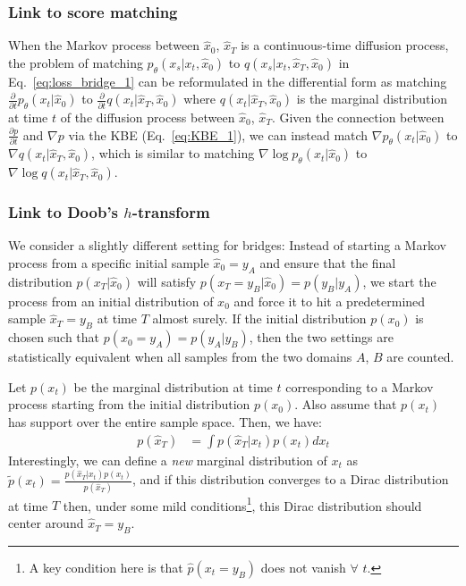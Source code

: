 \subsubsection{Link to score matching}

When the Markov process between $\hat{x}_{0}$, $\hat{x}_{T}$ is
a continuous-time diffusion process, the problem of matching $p_{\theta}\left(x_{s}|x_{t},\hat{x}_{0}\right)$
to $q\left(x_{s}|x_{t},\hat{x}_{T},\hat{x}_{0}\right)$ in Eq.~\ref{eq:loss_bridge_1}
can be reformulated in the differential form as matching $\frac{\partial}{\partial t}p_{\theta}\left(x_{t}|\hat{x}_{0}\right)$
to $\frac{\partial}{\partial t}q\left(x_{t}|\hat{x}_{T},\hat{x}_{0}\right)$
where $q\left(x_{t}|\hat{x}_{T},\hat{x}_{0}\right)$ is the marginal
distribution at time $t$ of the diffusion process between $\hat{x}_{0}$,
$\hat{x}_{T}$. Given the connection between $\frac{\partial p}{\partial t}$
and $\nabla p$ via the KBE (Eq.~\ref{eq:KBE_1}), we can instead
match $\nabla p_{\theta}\left(x_{t}|\hat{x}_{0}\right)$ to $\nabla q\left(x_{t}|\hat{x}_{T},\hat{x}_{0}\right)$,
which is similar to matching $\nabla\log p_{\theta}\left(x_{t}|\hat{x}_{0}\right)$
to $\nabla\log q\left(x_{t}|\hat{x}_{T},\hat{x}_{0}\right)$.

\subsubsection{Link to Doob's $h$-transform}

We consider a slightly different setting for bridges: Instead of starting
a Markov process from a specific initial sample $\hat{x}_{0}=y_{A}$
and ensure that the final distribution $p\left(x_{T}|\hat{x}_{0}\right)$
will satisfy $p\left(x_{T}=y_{B}|\hat{x}_{0}\right)=p\left(y_{B}|y_{A}\right)$,
we start the process from an initial distribution of $x_{0}$ and
force it to hit a predetermined sample $\hat{x}_{T}=y_{B}$ at time
$T$ almost surely. If the initial distribution $p\left(x_{0}\right)$
is chosen such that $p\left(x_{0}=y_{A}\right)=p\left(y_{A}|y_{B}\right)$,
then the two settings are statistically equivalent when all samples
from the two domains $A$, $B$ are counted.

Let $p\left(x_{t}\right)$ be the marginal distribution at time $t$
corresponding to a Markov process starting from the initial distribution
$p\left(x_{0}\right)$. Also assume that $p\left(x_{t}\right)$ has
support over the entire sample space. Then, we have:
\begin{align}
p\left(\hat{x}_{T}\right) & =\int p\left(\hat{x}_{T}|x_{t}\right)p\left(x_{t}\right)dx_{t}\label{eq:Doob_integral_t}
\end{align}
Interestingly, we can define a \emph{new} marginal distribution of
$x_{t}$ as $\tilde{p}\left(x_{t}\right)=\frac{p\left(\hat{x}_{T}|x_{t}\right)p\left(x_{t}\right)}{p\left(\hat{x}_{T}\right)}$,
and if this distribution converges to a Dirac distribution at time
$T$ then, under some mild conditions\footnote{A key condition here is that $\hat{p}\left(x_{t}=y_{B}\right)$ does
not vanish $\forall$ $t$.}, this Dirac distribution should center around $\hat{x}_{T}=y_{B}$.

